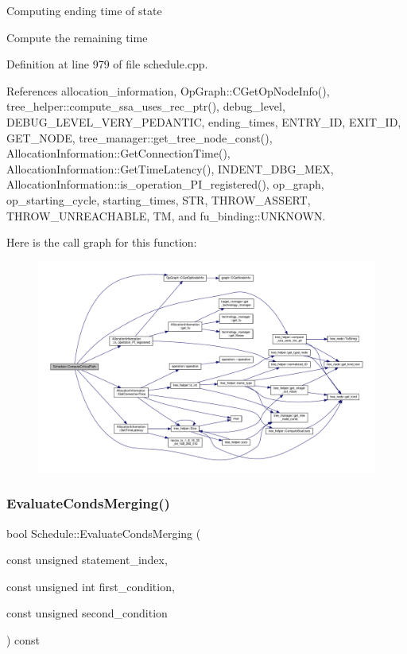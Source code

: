 Computing ending time of state

Compute the remaining time 

Definition at line 979 of file schedule.\+cpp.



References allocation\+\_\+information, Op\+Graph\+::\+C\+Get\+Op\+Node\+Info(), tree\+\_\+helper\+::compute\+\_\+ssa\+\_\+uses\+\_\+rec\+\_\+ptr(), debug\+\_\+level, D\+E\+B\+U\+G\+\_\+\+L\+E\+V\+E\+L\+\_\+\+V\+E\+R\+Y\+\_\+\+P\+E\+D\+A\+N\+T\+IC, ending\+\_\+times, E\+N\+T\+R\+Y\+\_\+\+ID, E\+X\+I\+T\+\_\+\+ID, G\+E\+T\+\_\+\+N\+O\+DE, tree\+\_\+manager\+::get\+\_\+tree\+\_\+node\+\_\+const(), Allocation\+Information\+::\+Get\+Connection\+Time(), Allocation\+Information\+::\+Get\+Time\+Latency(), I\+N\+D\+E\+N\+T\+\_\+\+D\+B\+G\+\_\+\+M\+EX, Allocation\+Information\+::is\+\_\+operation\+\_\+\+P\+I\+\_\+registered(), op\+\_\+graph, op\+\_\+starting\+\_\+cycle, starting\+\_\+times, S\+TR, T\+H\+R\+O\+W\+\_\+\+A\+S\+S\+E\+RT, T\+H\+R\+O\+W\+\_\+\+U\+N\+R\+E\+A\+C\+H\+A\+B\+LE, TM, and fu\+\_\+binding\+::\+U\+N\+K\+N\+O\+WN.

Here is the call graph for this function\+:
\nopagebreak
\begin{figure}[H]
\begin{center}
\leavevmode
\includegraphics[width=350pt]{df/d61/classSchedule_a7ab094843958d44cf31dc83a3e0b1ec7_cgraph}
\end{center}
\end{figure}
\mbox{\label{classSchedule_a65ecdc45dd59e27c5226bc34c16617dd}} 
\subsubsection{\texorpdfstring{Evaluate\+Conds\+Merging()}{EvaluateCondsMerging()}}
{\footnotesize\ttfamily bool Schedule\+::\+Evaluate\+Conds\+Merging (\begin{DoxyParamCaption}\item[{const unsigned}]{statement\+\_\+index,  }\item[{const unsigned int}]{first\+\_\+condition,  }\item[{const unsigned}]{second\+\_\+condition }\end{DoxyParamCaption}) const}



